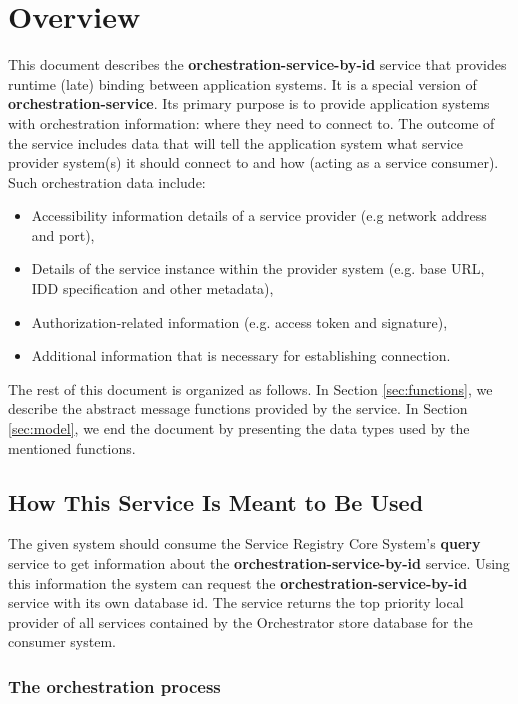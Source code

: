 \documentclass[a4paper]{arrowhead}
\begin{document}
\section{Overview}
\label{sec:overview}
This document describes the \textbf{orchestration-service-by-id} service that provides runtime (late) binding between application systems. It is a special version of \textbf{orchestration-service}. Its primary purpose is to provide application systems with orchestration information: where they need to connect to. The outcome of the service includes data that will tell the application system what service provider system(s) it should connect to and how (acting as a service consumer). Such orchestration data include:

\begin{itemize}
    \item Accessibility information details of a service provider (e.g network address and port),
    \item Details of the service instance within the provider system (e.g. base URL, IDD specification and other metadata),
    \item Authorization-related information (e.g. access token and signature),
    \item Additional information that is necessary for establishing connection.
\end{itemize}

The rest of this document is organized as follows.
In Section \ref{sec:functions}, we describe the abstract message functions provided by the service.
In Section \ref{sec:model}, we end the document by presenting the data types used by the mentioned functions.

\subsection{How This Service Is Meant to Be Used}
The given system should consume the Service Registry Core System’s \textbf{query} service to get information about the \textbf{orchestration-service-by-id} service. Using this information the system can request the \textbf{orchestration-service-by-id} service with its own database id. The service returns the top priority local provider of all services contained by the Orchestrator store database for the consumer system.

\subsubsection{The orchestration process}
\end{document}
